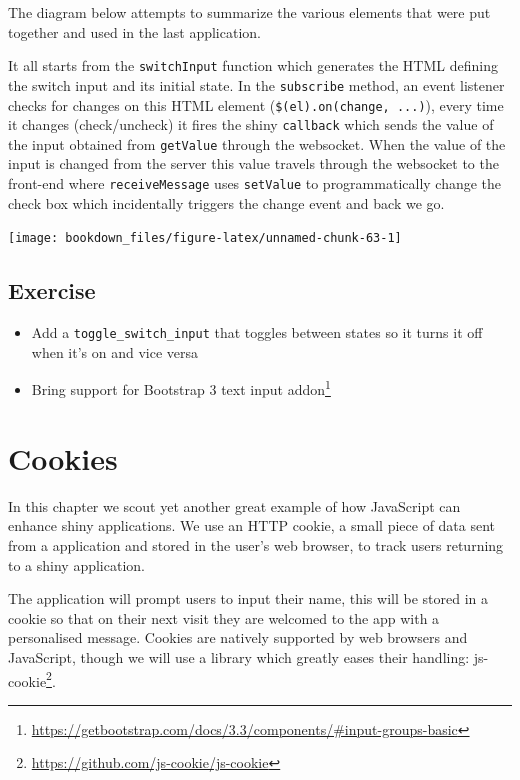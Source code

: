 \documentclass[
]{krantz}
\providecommand{\tightlist}{%
  \setlength{\itemsep}{0pt}\setlength{\parskip}{0pt}}
\renewcommand{\href}[2]{#2\footnote{\url{#1}}}
\begin{document}
The diagram below attempts to summarize the various elements that were put together and used in the last application.

It all starts from the \texttt{switchInput} function which generates the HTML defining the switch input and its initial state. In the \texttt{subscribe} method, an event listener checks for changes on this HTML element (\texttt{\$(el).on(\textquotesingle{}change\textquotesingle{},\ ...)}), every time it changes (check/uncheck) it fires the shiny \texttt{callback} which sends the value of the input obtained from \texttt{getValue} through the websocket. When the value of the input is changed from the server this value travels through the websocket to the front-end where \texttt{receiveMessage} uses \texttt{setValue} to programmatically change the check box which incidentally triggers the change event and back we go.

\begin{center}\texttt{[image: bookdown\_files/figure-latex/unnamed-chunk-63-1]} \end{center}

\hypertarget{shiny-input-excercise}{%
\section{Exercise}\label{shiny-input-excercise}}

\begin{itemize}
\tightlist
\item
  Add a \texttt{toggle\_switch\_input} that toggles between states so it turns it off when it's on and vice versa
\item
  Bring support for \href{https://getbootstrap.com/docs/3.3/components/\#input-groups-basic}{Bootstrap 3 text input addon}
\end{itemize}

\hypertarget{shiny-cookies}{%
\chapter{Cookies}\label{shiny-cookies}}

In this chapter we scout yet another great example of how JavaScript can enhance shiny applications. We use an HTTP cookie, a small piece of data sent from a application and stored in the user's web browser, to track users returning to a shiny application.

The application will prompt users to input their name, this will be stored in a cookie so that on their next visit they are welcomed to the app with a personalised message. Cookies are natively supported by web browsers and JavaScript, though we will use a library which greatly eases their handling: \href{https://github.com/js-cookie/js-cookie}{js-cookie}.
\end{document}
